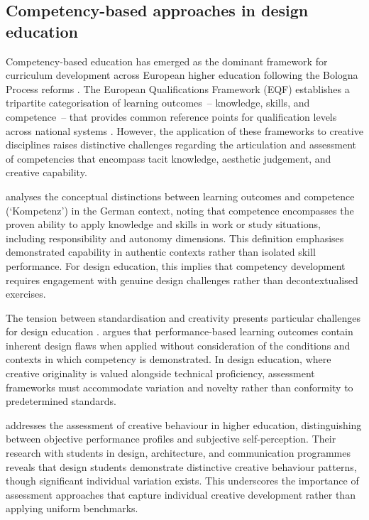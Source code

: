 \documentclass[ed]{acnsart}
\begin{document}
	\subsection{Competency-based approaches in design education}
	
	Competency-based education has emerged as the dominant framework for curriculum development across European higher education following the Bologna Process reforms \cite{Castillo2011230}. The European Qualifications Framework (EQF) establishes a tripartite categorisation of learning outcomes~-- knowledge, skills, and competence~-- that provides common reference points for qualification levels across national systems \cite{Bohlinger2012279}. However, the application of these frameworks to creative disciplines raises distinctive challenges regarding the articulation and assessment of competencies that encompass tacit knowledge, aesthetic judgement, and creative capability.
	
	\citet{Gehmlich2009736} analyses the conceptual distinctions between learning outcomes and competence (`Kompetenz') in the German context, noting that competence encompasses the proven ability to apply knowledge and skills in work or study situations, including responsibility and autonomy dimensions. This definition emphasises demonstrated capability in authentic contexts rather than isolated skill performance. For design education, this implies that competency development requires engagement with genuine design challenges rather than decontextualised exercises.
	
	The tension between standardisation and creativity presents particular challenges for design education \cite{Weldon2009168}. \citet{Brockmann200899} argues that performance-based learning outcomes contain inherent design flaws when applied without consideration of the conditions and contexts in which competency is demonstrated. In design education, where creative originality is valued alongside technical proficiency, assessment frameworks must accommodate variation and novelty rather than conformity to predetermined standards.
	
	\citet{AlvarezIcaza2024} addresses the assessment of creative behaviour in higher education, distinguishing between objective performance profiles and subjective self-perception. Their research with students in design, architecture, and communication programmes reveals that design students demonstrate distinctive creative behaviour patterns, though significant individual variation exists. This underscores the importance of assessment approaches that capture individual creative development rather than applying uniform benchmarks.
	
\end{document}
